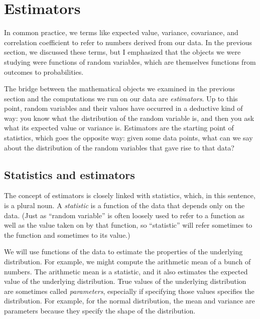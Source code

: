 

\chapter{Estimators}

In common practice, we terms like expected value, variance, covariance, and
correlation coefficient to refer to numbers derived from our data. In the
previous section, we discussed these terms, but I emphasized that the objects
we were studying were functions of random variables, which are themselves
functions from outcomes to probabilities.

The bridge between the mathematical objects we examined in the previous section
and the computations we run on our data are \emph{estimators}. Up to this
point, random variables and their values have occurred in a deductive kind of
way: you know what the distribution of the random variable is, and then you ask
what its expected value or variance is. Estimators are the starting point of
statistics, which goes the opposite way: given some data points, what can we
say about the distribution of the random variables that gave rise to that data?

\section{Statistics and estimators}

The concept of estimators is closely linked with statistics, which, in this
sentence, is a plural noun. A \emph{statistic} is a function of the data that
depends only on the data. (Just as ``random variable'' is often loosely used
to refer to a function as well as the value taken on by that function, so
``statistic'' will refer sometimes to the function and sometimes to its
value.)

We will use functions of the data to estimate
the properties of the underlying distribution. For example, we might compute
the arithmetic mean of a bunch of numbers. The arithmetic mean is a statistic,
and it also estimates the expected value of the underlying distribution. True
values of the underlying distribution are sometimes called \emph{parameters},
especially if specifying those values specifies the distribution. For example,
for the normal distribution, the mean and variance are parameters because they
specify the shape of the distribution.


